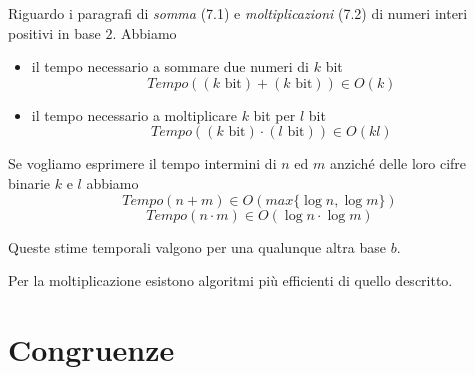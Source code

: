 \documentclass[a4paper,12pt, oneside]{book}
\begin{document}
\begin{esempio}
	Riguardo i paragrafi di \textit{somma} (7.1) e \textit{moltiplicazioni} (7.2) di numeri interi positivi in base $2$. Abbiamo \begin{itemize}
		\item il tempo necessario a sommare due numeri di $k$ bit
		      $$Tempo((k \mbox{ bit}) + (k \mbox{ bit})) \in O(k)$$
		\item il tempo necessario a moltiplicare $k$ bit per $l$ bit
		      $$Tempo((k \mbox{ bit}) \cdot (l \mbox{ bit})) \in O(kl)$$
	\end{itemize}
	Se vogliamo esprimere il tempo intermini di $n$ ed $m$ anziché delle loro cifre binarie $k$ e $l$ abbiamo
	$$Tempo(n+m) \in O(max\{\log n,\log m\})$$
	$$Tempo(n\cdot m) \in O(\log n \cdot \log m)$$
	\begin{nota}
		Queste stime temporali valgono per una qualunque altra base $b$.
	\end{nota}
	\begin{nota}
		Per la moltiplicazione esistono algoritmi più efficienti di quello descritto.
	\end{nota}
\end{esempio}

\chapter{Congruenze}
\end{document}

